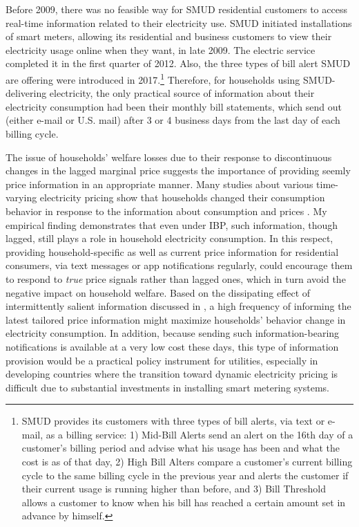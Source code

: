 Before 2009, there was no feasible way for SMUD residential customers to access real-time information related to their electricity use. SMUD initiated installations of smart meters, allowing its residential and business customers to view their electricity usage online when they want, in late 2009. The electric service completed it in the first quarter of 2012. Also, the three types of bill alert SMUD are offering were introduced in 2017.\footnote{SMUD provides its customers with three types of bill alerts, via text or e-mail, as a billing service: 1) Mid-Bill Alerts send an alert on the 16th day of a customer's billing period and advise what his usage has been and what the cost is as of that day, 2) High Bill Alters compare a customer's current billing cycle to the same billing cycle in the previous year and alerts the customer if their current usage is running higher than before, and 3) Bill Threshold allows a customer to know when his bill has reached a certain amount set in advance by himself.} Therefore, for households using SMUD-delivering electricity, the only practical source of information about their electricity consumption had been their monthly bill statements, which send out (either e-mail or U.S. mail) after 3 or 4 business days from the last day of each billing cycle. 

The issue of households' welfare losses due to their response to discontinuous changes in the lagged marginal price suggests the importance of providing seemly price information in an appropriate manner. Many studies about various time-varying electricity pricing show that households changed their consumption behavior in response to the information about consumption and prices \citep{Dynamic-Pricing-of-Electricity-in-the-Mid-Atlantic-Region_Econometric-Results-from-the-Baltimore-Gas-and-Electric-Company-Experiment_Faruqui-et-al_2011, Knowledge-is-Less-Power_Jessoe-and-Rapson_2014, The-Effect-of-Information-on-TOU-Electricity-Use:An-Irish-Residential-Study_Pon_2017, Information-vs-Automation-and-Implications-for-Dynamic-Pricing_Bollinger-and-Hartmann_2020}. My empirical finding demonstrates that even under IBP, such information, though lagged, still plays a role in household electricity consumption. In this respect, providing household-specific as well as current price information for residential consumers, via text messages or app notifications regularly, could encourage them to respond to \textit{true} price signals rather than lagged ones, which in turn avoid the negative impact on household welfare. Based on the dissipating effect of intermittently salient information discussed in \cite{Dynamic-Salience-with-Intermittent-Billing_Gilbert-and-Zivin_2014}, a high frequency of informing the latest tailored price information might maximize households' behavior change in electricity consumption. In addition, because sending such information-bearing notifications is available at a very low cost these days, this type of information provision would be a practical policy instrument for utilities, especially in developing countries where the transition toward dynamic electricity pricing is difficult due to substantial investments in installing smart metering systems. 
